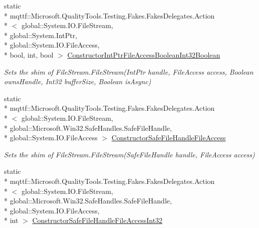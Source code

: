 \begin{DoxyCompactItemize}
static \\*
mqttf\-::\-Microsoft.\-Quality\-Tools.\-Testing.\-Fakes.\-Fakes\-Delegates.\-Action\\*
$<$ global\-::\-System.\-I\-O.\-File\-Stream, \\*
global\-::\-System.\-Int\-Ptr, \\*
global\-::\-System.\-I\-O.\-File\-Access, \\*
bool, int, bool $>$ \hyperlink{class_system_1_1_i_o_1_1_fakes_1_1_shim_file_stream_a83107b287fdc87c6f6f2433f144549e2}{Constructor\-Int\-Ptr\-File\-Access\-Boolean\-Int32\-Boolean}
\begin{DoxyCompactList}\small\item\em Sets the shim of File\-Stream.\-File\-Stream(\-Int\-Ptr handle, File\-Access access, Boolean owns\-Handle, Int32 buffer\-Size, Boolean is\-Async)\end{DoxyCompactList}\item 
static \\*
mqttf\-::\-Microsoft.\-Quality\-Tools.\-Testing.\-Fakes.\-Fakes\-Delegates.\-Action\\*
$<$ global\-::\-System.\-I\-O.\-File\-Stream, \\*
global\-::\-Microsoft.\-Win32.\-Safe\-Handles.\-Safe\-File\-Handle, \\*
global\-::\-System.\-I\-O.\-File\-Access $>$ \hyperlink{class_system_1_1_i_o_1_1_fakes_1_1_shim_file_stream_a132e162e7c4091e0b866849bc370b895}{Constructor\-Safe\-File\-Handle\-File\-Access}
\begin{DoxyCompactList}\small\item\em Sets the shim of File\-Stream.\-File\-Stream(\-Safe\-File\-Handle handle, File\-Access access)\end{DoxyCompactList}\item 
static \\*
mqttf\-::\-Microsoft.\-Quality\-Tools.\-Testing.\-Fakes.\-Fakes\-Delegates.\-Action\\*
$<$ global\-::\-System.\-I\-O.\-File\-Stream, \\*
global\-::\-Microsoft.\-Win32.\-Safe\-Handles.\-Safe\-File\-Handle, \\*
global\-::\-System.\-I\-O.\-File\-Access, \\*
int $>$ \hyperlink{class_system_1_1_i_o_1_1_fakes_1_1_shim_file_stream_a4400df0b3883247858c96a5e27225d00}{Constructor\-Safe\-File\-Handle\-File\-Access\-Int32}

\end{DoxyCompactItemize}
